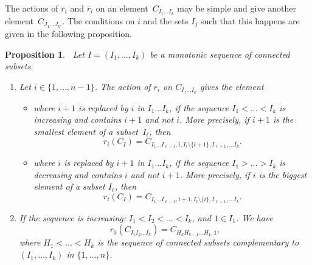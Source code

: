 \documentclass[pdftex]{sigma}
\numberwithin{equation}{section}
\newtheorem{prop}[theo]{Proposition}
\theoremstyle{definition}
\newcommand{\rb}{\overline{r}}
\begin{document}
The actions of $r_i$ and $\rb_i$ on an element~$C_{I_1\dots I_k}$ may be simple and give another element~$C_{J_1\dots J_{k'}}$. The conditions on $i$ and the sets $I_j$ such that
this happens are given in the following proposition.
\begin{prop}\label{prop-act-ri}$\ $
Let $I=(I_1,\dots,I_k)$ be a monotonic sequence of connected subsets.
\begin{enumerate}\itemsep=0pt
\item[$1.$] Let $i\in\{1,\dots,n-1\}$. The action of $r_i$ on $C_{I_1\dots I_k}$ gives the element
\begin{itemize}\itemsep=0pt
\item where $i+1$ is replaced by $i$ in $I_1\dots I_k$, if the sequence $I_1<\dots<I_k$ is increasing and contains {$i+1$} and not $i$.
More precisely, if $i+1$ is the smallest element of a subset~$I_\ell$, then
\begin{equation*}
 r_i(C_I)= C_{I_1\dots I_{\ell-1}, i, I_{\ell}\setminus \{i+1\}, I_{\ell+1},\dots I_k}.
\end{equation*}

\item where $i$ is replaced by $i+1$ in $I_1\dots I_k$, if the sequence $I_1>\dots>I_k$ is decreasing and contains {$i$} and not $i+1$.
More precisely, if $i$ is the biggest element of a subset $I_\ell$, then
\begin{equation*}
 r_i(C_I)= C_{I_1\dots I_{\ell-1}, i+1, I_{\ell}\setminus \{i\}, I_{\ell+1},\dots I_k}.
\end{equation*}
\end{itemize}
\item[$2.$] If the sequence is increasing: $I_1 < I_2 <\dots< I_k$, and $1\in I_1$. We have
\begin{equation*}
 r_0( C_{I_1I_2\dots I_k} ) = C_{H_k H_{k-1}\dots H_1, 1},
\end{equation*}
where $H_1<\dots < H_k$ is the sequence of connected subsets complementary to $(I_1,\dots,I_k)$ in $\{1,\dots,n\}$.
\end{enumerate}
\end{prop}
\end{document}

